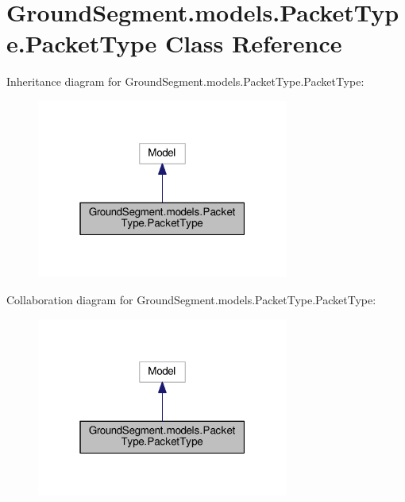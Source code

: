 \hypertarget{class_ground_segment_1_1models_1_1_packet_type_1_1_packet_type}{}\section{Ground\+Segment.\+models.\+Packet\+Type.\+Packet\+Type Class Reference}
\label{class_ground_segment_1_1models_1_1_packet_type_1_1_packet_type}


Inheritance diagram for Ground\+Segment.\+models.\+Packet\+Type.\+Packet\+Type\+:\nopagebreak
\begin{figure}[H]
\begin{center}
\leavevmode
\includegraphics[width=235pt]{class_ground_segment_1_1models_1_1_packet_type_1_1_packet_type__inherit__graph}
\end{center}
\end{figure}


Collaboration diagram for Ground\+Segment.\+models.\+Packet\+Type.\+Packet\+Type\+:\nopagebreak
\begin{figure}[H]
\begin{center}
\leavevmode
\includegraphics[width=235pt]{class_ground_segment_1_1models_1_1_packet_type_1_1_packet_type__coll__graph}
\end{center}
\end{figure}
